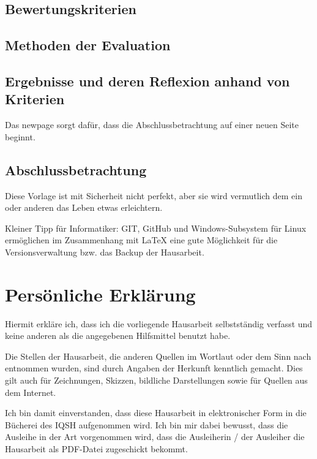 \documentclass[a4paper, 12pt]{article}
\begin{document}
\subsection{Bewertungskriterien}
\subsection{Methoden der Evaluation}
\subsection{Ergebnisse und deren Reflexion anhand von Kriterien}
Das newpage sorgt dafür, dass die Abschlussbetrachtung auf einer neuen Seite beginnt.
\newpage
\subsection{Abschlussbetrachtung}
Diese Vorlage ist mit Sicherheit nicht perfekt, aber sie wird vermutlich dem ein oder anderen das Leben etwas erleichtern.

Kleiner Tipp für Informatiker: \glqq GIT\grqq{}, \glqq GitHub\grqq{} und \glqq Windows-Subsystem für Linux\grqq{} ermöglichen im Zusammenhang mit \LaTeX{} eine gute Möglichkeit für die Versionsverwaltung bzw. das Backup der Hausarbeit.


\newpage
\thispagestyle{empty}



\newpage
\thispagestyle{empty}
\section*{Persönliche Erklärung}

Hiermit erkläre ich, dass ich die vorliegende Hausarbeit selbstständig verfasst und keine anderen als die angegebenen Hilfsmittel benutzt habe.

Die Stellen der Hausarbeit, die anderen Quellen im Wortlaut oder dem Sinn nach entnommen wurden, sind durch Angaben der Herkunft kenntlich gemacht. Dies gilt auch für Zeichnungen, Skizzen, bildliche Darstellungen sowie für Quellen aus dem Internet.

Ich bin damit einverstanden, dass diese Hausarbeit in elektronischer Form in die Bücherei des IQSH aufgenommen wird. Ich bin mir dabei bewusst, dass die Ausleihe in der Art vorgenommen wird, dass die Ausleiherin / der Ausleiher die Hausarbeit als PDF-Datei zugeschickt bekommt.
\end{document}
